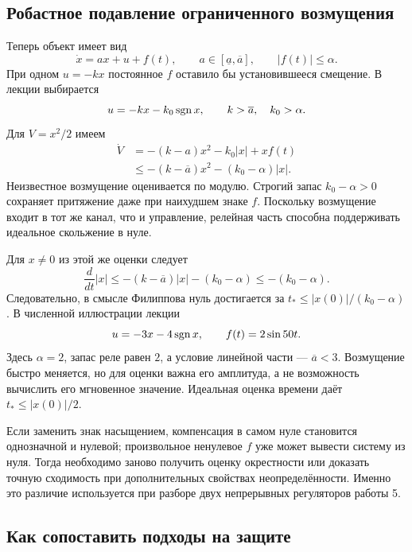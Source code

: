 \subsection{Робастное подавление ограниченного возмущения}

Теперь объект имеет вид
\[
 \dot x=ax+u+f(t),\qquad
 a\in[\underline a,\overline a],\qquad |f(t)|\le\alpha.
\]
При одном $u=-kx$ постоянное $f$ оставило бы установившееся смещение.
В лекции выбирается
\begin{equation}
 u=-kx-k_0\operatorname{sgn} x,\qquad k>\overline a,\quad k_0>\alpha.
 \label{eq:robust-scalar}
\end{equation}
Для $V=x^2/2$ имеем
\begin{align*}
 \dot V&=-(k-a)x^2-k_0|x|+xf(t)\\
 &\le-(k-\overline a)x^2-(k_0-\alpha)|x|.
\end{align*}
Неизвестное возмущение оценивается по модулю. Строгий запас
$k_0-\alpha>0$ сохраняет притяжение даже при наихудшем знаке $f$.
Поскольку возмущение входит в тот же канал, что и управление, релейная
часть способна поддерживать идеальное скольжение в нуле.

\addition Для $x\ne0$ из этой же оценки следует
\[
 \frac{d}{dt}|x|\le-(k-\overline a)|x|-(k_0-\alpha)
 \le-(k_0-\alpha).
\]
Следовательно, в смысле Филиппова нуль достигается за
$t_*\le|x(0)|/(k_0-\alpha)$.
В численной иллюстрации лекции
\[
 u=-3x-4\operatorname{sgn} x,\qquad f(t)=2\sin50t.
\]
Здесь $\alpha=2$, запас реле равен $2$, а условие линейной части ---
$\overline a<3$. Возмущение быстро меняется, но для оценки важна его
амплитуда, а не возможность вычислить его мгновенное значение.
Идеальная оценка времени даёт $t_*\le|x(0)|/2$.

Если заменить знак насыщением, компенсация в самом нуле становится
однозначной и нулевой; произвольное ненулевое $f$ уже может вывести систему
из нуля. Тогда необходимо заново получить оценку окрестности или доказать
точную сходимость при дополнительных свойствах неопределённости.
Именно это различие используется при разборе двух непрерывных регуляторов
работы 5.

\subsection{Как сопоставить подходы на защите}


